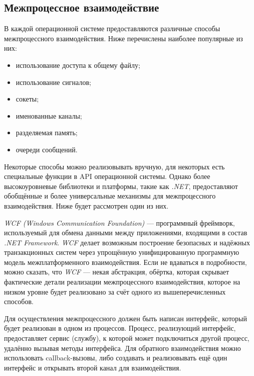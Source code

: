 \subsection{Межпроцессное взаимодействие}
\label{sec:ipc}

В каждой операционной системе предоставляются различные способы межпроцессного взаимодействия. Ниже перечислены наиболее популярные из них:
\begin{itemize}
   \item использование доступа к общему файлу;
   \item использование сигналов;
   \item сокеты;
   \item именованные каналы;
   \item разделяемая память;
   \item очереди сообщений.
\end{itemize}

Некоторые способы можно реализовывать вручную, для некоторых есть специальные функции в API операционной системы. Однако более высокоуровневые библиотеки и платформы, такие как {\it .NET}, предоставляют обобщённые и более универсальные механизмы для межпроцессного взаимодействия. Ниже будет рассмотрен один из них.

{\it WCF (Windows Communication Foundation)} --- программный фреймворк, используемый для обмена данными между приложениями, входящими в состав {\it .NET Framework}. {\it WCF} делает возможным построение безопасных и надёжных транзакционных систем через упрощённую унифицированную программную модель межплатформенного взаимодействия. Если не вдаваться в подробности, можно сказать, что {\it WCF} --- некая абстракция, обёртка, которая скрывает фактические детали реализации межпроцессного взаимодействия, которое на низком уровне будет реализовано за счёт одного из вышеперечисленных способов. 

Для осуществления межпроцессного должен быть написан интерфейс, который будет реализован в одном из процессов. Процесс, реализующий интерфейс, предоставляет сервис (службу), к которой может подключиться другой процесс, удалённо вызывая методы интерфейса. Для обратного взаимодействия можно использовать callback-вызовы, либо создавать и реализовывать ещё один интерфейс и открывать второй канал для взаимодействия. 



\pagebreak
